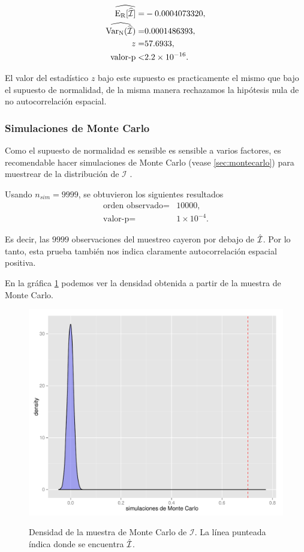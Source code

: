 \begin{align*}
\widehat{{\rm{E_R}} [ \widehat{\mathcal{I}}]} =& -0.0004073320,  \\ 
\widehat{{\rm{Var_N}}(\widehat{\mathcal{I}})} =& 0.0001486393, \\
z =& 57.6933, \\
\mbox{valor-p} <& 2.2 \times 10^{-16}.
\end{align*}

El valor del estadístico $z$ bajo este supuesto es practicamente el mismo que bajo el supuesto de normalidad, de la misma manera rechazamos la hipótesis nula de no autocorrelación espacial.
\subsubsection{Simulaciones de Monte Carlo}
Como el supuesto de normalidad es sensible es sensible a varios factores, es recomendable hacer simulaciones de Monte Carlo (vease \ref{sec:montecarlo}) para muestrear de la distribución de $\mathcal{I}$ .

Usando $n_{sim}=9999$, se obtuvieron los siguientes resultados
\begin{align*}
\mbox{orden observado} =& 10000,\\
\mbox{valor-p} =& 1\times 10^{-4}.
\end{align*}

Es decir, las  $9999$ observaciones del muestreo cayeron por debajo de $\Hat{\mathcal{I}}$. Por lo tanto, esta prueba también nos indica claramente autocorrelación espacial positiva.

En la gráfica \ref{obj:morandensity} podemos ver la densidad obtenida a partir de la muestra de Monte Carlo. 

\begin{figure}[!ht]
\centering
\includegraphics[width=.6\textwidth]{./plots/moran_density.pdf} \\
\caption{Densidad de la muestra de Monte Carlo de $\mathcal{I}$. La línea punteada índica donde se encuentra $\Hat{\mathcal{I}}$.}
\label{obj:morandensity}  
\end{figure}

